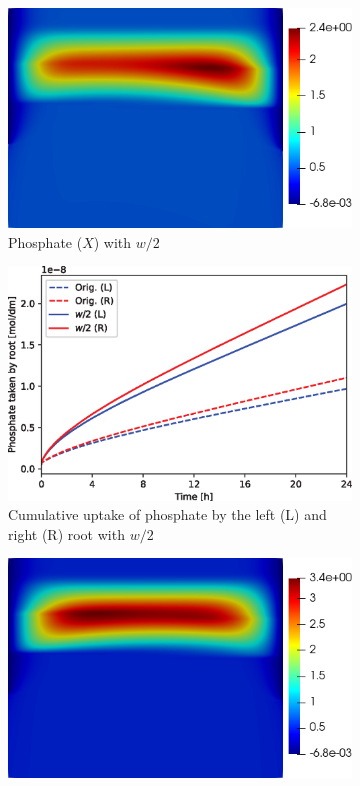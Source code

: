 \documentclass[11pt]{article}
\numberwithin{equation}{section}
\begin{document}
\begin{figure}[!htb]
\centering
\begin{subfigure}[t]{0.35\textwidth}
    \includegraphics[width=\textwidth]{Figures/X_wdivby2.png}
    \caption{Phosphate ($X$) with $w/2$}
    \label{fig:numexp_w1}
\end{subfigure}
\hspace{1cm}
\begin{subfigure}[t]{0.4\textwidth}
    \includegraphics[width=\textwidth]{Figures/wdivby2.eps}
    \caption{Cumulative uptake of phosphate by the left (L) and right (R) root with $w/2$}
    \label{fig:numexp_w2}
\end{subfigure}
\qquad
\begin{subfigure}[t]{0.35\textwidth}
    \includegraphics[width=\textwidth]{Figures/X_F11times10wdivby2.png}

\end{subfigure}
\end{figure}
\end{document}

